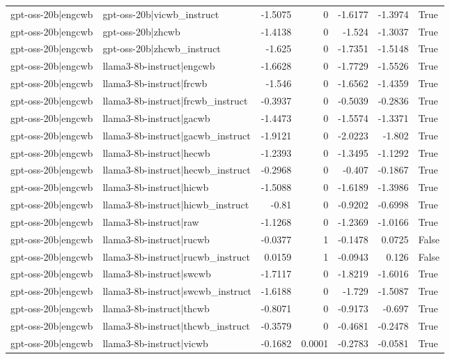 \begin{table}
\begin{tabular}{l l r r r r l}
gpt-oss-20b|engcwb & gpt-oss-20b|vicwb_instruct & -1.5075 & 0 & -1.6177 & -1.3974 & True \\
gpt-oss-20b|engcwb & gpt-oss-20b|zhcwb & -1.4138 & 0 & -1.524 & -1.3037 & True \\
gpt-oss-20b|engcwb & gpt-oss-20b|zhcwb_instruct & -1.625 & 0 & -1.7351 & -1.5148 & True \\
gpt-oss-20b|engcwb & llama3-8b-instruct|engcwb & -1.6628 & 0 & -1.7729 & -1.5526 & True \\
gpt-oss-20b|engcwb & llama3-8b-instruct|frcwb & -1.546 & 0 & -1.6562 & -1.4359 & True \\
gpt-oss-20b|engcwb & llama3-8b-instruct|frcwb_instruct & -0.3937 & 0 & -0.5039 & -0.2836 & True \\
gpt-oss-20b|engcwb & llama3-8b-instruct|gacwb & -1.4473 & 0 & -1.5574 & -1.3371 & True \\
gpt-oss-20b|engcwb & llama3-8b-instruct|gacwb_instruct & -1.9121 & 0 & -2.0223 & -1.802 & True \\
gpt-oss-20b|engcwb & llama3-8b-instruct|hecwb & -1.2393 & 0 & -1.3495 & -1.1292 & True \\
gpt-oss-20b|engcwb & llama3-8b-instruct|hecwb_instruct & -0.2968 & 0 & -0.407 & -0.1867 & True \\
gpt-oss-20b|engcwb & llama3-8b-instruct|hicwb & -1.5088 & 0 & -1.6189 & -1.3986 & True \\
gpt-oss-20b|engcwb & llama3-8b-instruct|hicwb_instruct & -0.81 & 0 & -0.9202 & -0.6998 & True \\
gpt-oss-20b|engcwb & llama3-8b-instruct|raw & -1.1268 & 0 & -1.2369 & -1.0166 & True \\
gpt-oss-20b|engcwb & llama3-8b-instruct|rucwb & -0.0377 & 1 & -0.1478 & 0.0725 & False \\
gpt-oss-20b|engcwb & llama3-8b-instruct|rucwb_instruct & 0.0159 & 1 & -0.0943 & 0.126 & False \\
gpt-oss-20b|engcwb & llama3-8b-instruct|swcwb & -1.7117 & 0 & -1.8219 & -1.6016 & True \\
gpt-oss-20b|engcwb & llama3-8b-instruct|swcwb_instruct & -1.6188 & 0 & -1.729 & -1.5087 & True \\
gpt-oss-20b|engcwb & llama3-8b-instruct|thcwb & -0.8071 & 0 & -0.9173 & -0.697 & True \\
gpt-oss-20b|engcwb & llama3-8b-instruct|thcwb_instruct & -0.3579 & 0 & -0.4681 & -0.2478 & True \\
gpt-oss-20b|engcwb & llama3-8b-instruct|vicwb & -0.1682 & 0.0001 & -0.2783 & -0.0581 & True \\

\end{tabular}
\end{table}
